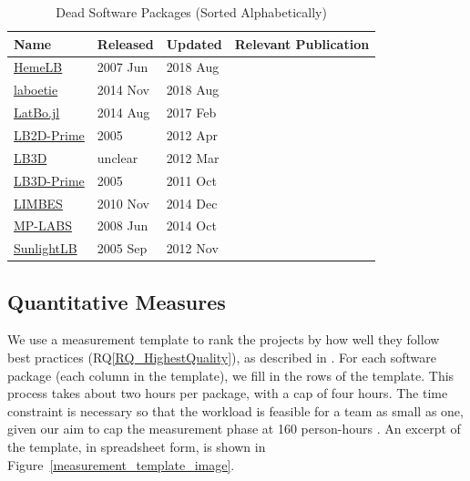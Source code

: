 \documentclass[final, 3p, times, authoryear]{elsarticle}
\newcommand{\rqref}[1]{RQ\ref{#1}}
\begin{document}
\begin{table}[ht!]
	\begin{center}
		\begin{tabular}{ p{3cm}p{2cm}p{2cm}p{5.5cm} }
			\toprule
			Name & Released & Updated & Relevant Publication\\
			\midrule
			\href{https://github.com/UCL/hemelb}{HemeLB} & 2007 Jun & 2018 Aug&\citep{mazzeo2008hemelb}\\
			\href{https://github.com/maxlevesque/laboetie}{laboetie} & 2014 Nov & 2018 Aug&\citep{levesque2013accounting}\\		
			\href{https://github.com/UCL/LatBo.jl}{LatBo.jl} & 2014 Aug & 2017 Feb&\\
			\href{https://code.google.com/p/lb2d-prime-dev/source}{LB2D-Prime} & 2005 & 2012 Apr&\\
			\href{http://ccs.chem.ucl.ac.uk/sites/ccs.chem.ucl.ac.uk/themes/ccs2/files/lb3d-2012-03-12.tgz}{LB3D} & unclear & 2012 Mar&\citep{schmieschek2017lb3d}\\
			\href{https://code.google.com/archive/p/lb3d-prime-dev/source}{LB3D-Prime} & 2005 & 2011 Oct&\\
			\href{https://code.google.com/archive/p/limbes/source}{LIMBES} & 2010 Nov & 2014 Dec&\\
			\href{https://github.com/carlosrosales/mplabs}{MP-LABS} & 2008 Jun & 2014 Oct&\\
			\href{https://sourceforge.net/projects/sunlightlb/files/latest/download}{SunlightLB} & 2005 Sep & 2012 Nov&\\
			\bottomrule
		\end{tabular}
		\caption{Dead Software Packages (Sorted Alphabetically)} \label{deadpackages}
	\end{center}
\end{table}

\subsection{Quantitative Measures} \label{empiricalmeasures}

We use a measurement template to rank the projects by how well they follow best
practices (\rqref{RQ_HighestQuality}), as described in \citet{SmithEtAl2021}. %
For each software package (each column in the template), we fill in the rows of
the template. This process takes about two hours per package, with a cap of four
hours. The time constraint is necessary so that the workload is feasible for a
team as small as one, given our aim to cap the measurement phase at 160
person-hours \citep{SmithEtAl2021}. %
An excerpt of the template, in spreadsheet
form, is shown in Figure~\ref{measurement_template_image}.
\end{document}
